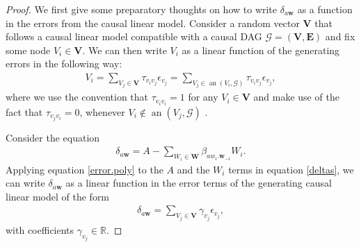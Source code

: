 \documentclass[11pt,a4paper]{article}
\theoremstyle{definition}
\theoremstyle{remark}
\DeclareMathOperator{\pa}{pa}
\DeclareMathOperator{\an}{an}
\newcommand{\g}[1][G]{\mathcal{#1}}
\begin{document}
\begin{proof}
	We first give some preparatory thoughts on how to write $\delta_{a\mathbf{w}}$ as a function in the errors from the causal linear model. Consider a random vector $\mathbf{V}$ that follows a causal linear model compatible with a causal DAG $\g=(\mathbf{V},\mathbf{E})$ and fix some node $V_i \in \mathbf{V}$. 
%	
%	
	We can then write $V_i$ as a linear function of the generating errors in the following way:
	\begin{align}
	V_i = \sum_{V_j \in \mathbf{V}} \tau_{v_iv_j} \epsilon_{v_j} = \sum_{V_j \in \an(V_i,\g)} \tau_{v_iv_j} \epsilon_{v_j}, \label{error.poly} 
	\end{align}
	where we use the convention that $\tau_{v_iv_i}=1$ for any $V_i \in \mathbf{V}$ and make use of the fact that $\tau_{v_jv_i}=0$, whenever $V_i \notin \an(V_j,\g)$ \citep{SEM1989}. 
	
	
	
	
	
	Consider the equation
	\begin{align}
	\delta_{a\mathbf{w}} = A - \sum_{W_i \in \mathbf{W}} \beta_{aw_i.\mathbf{w}_{-i}} W_i. \label{deltas}
	\end{align}
	Applying equation \eqref{error.poly} to the $A$ and the $W_i$ terms in equation \eqref{deltas}, we can write 
	$\delta_{a\mathbf{w}}$ 
	as a linear function in the error terms of the generating causal linear model of the form
	\begin{align}
		\delta_{a\mathbf{w}} = \sum_{V_j \in \mathbf{V}} \gamma_{v_j} \epsilon_{v_j},
		\label{equ-errors}
	\end{align}
	with coefficients $\gamma_{v_j} \in \mathbb{R}$.
	

\end{proof}
\end{document}
